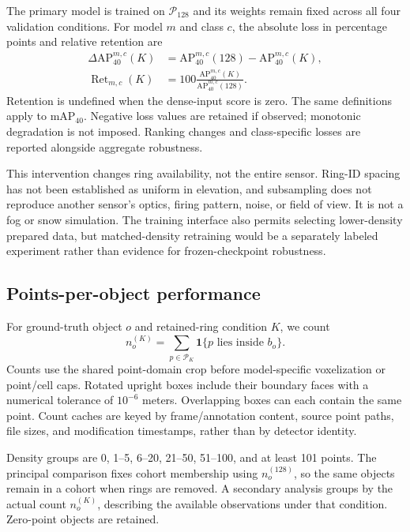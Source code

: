 \documentclass[10pt,twocolumn]{article}
\newcommand{\ap}{\mathrm{AP}_{40}}
\newcommand{\map}{\mathrm{mAP}_{40}}
\begin{document}
The primary model is trained on $\mathcal{P}_{128}$ and its weights remain fixed across all four validation conditions. For model $m$ and class $c$, the absolute loss in percentage points and relative retention are
\begin{align}
\Delta\ap^{m,c}(K)&=\ap^{m,c}(128)-\ap^{m,c}(K),\\
\operatorname{Ret}_{m,c}(K)&=100\frac{\ap^{m,c}(K)}{\ap^{m,c}(128)}.
\end{align}
Retention is undefined when the dense-input score is zero. The same definitions apply to $\map$. Negative loss values are retained if observed; monotonic degradation is not imposed. Ranking changes and class-specific losses are reported alongside aggregate robustness.

This intervention changes ring availability, not the entire sensor. Ring-ID spacing has not been established as uniform in elevation, and subsampling does not reproduce another sensor's optics, firing pattern, noise, or field of view. It is not a fog or snow simulation. The training interface also permits selecting lower-density prepared data, but matched-density retraining would be a separately labeled experiment rather than evidence for frozen-checkpoint robustness.

\subsection{Points-per-object performance}
\label{sec:density}
For ground-truth object $o$ and retained-ring condition $K$, we count
\begin{equation}
n_o^{(K)}=\sum_{p\in\mathcal{P}_K}\mathbf{1}\{p\text{ lies inside }b_o\}.
\end{equation}
Counts use the shared point-domain crop before model-specific voxelization or point/cell caps. Rotated upright boxes include their boundary faces with a numerical tolerance of $10^{-6}$ meters. Overlapping boxes can each contain the same point. Count caches are keyed by frame/annotation content, source point paths, file sizes, and modification timestamps, rather than by detector identity.

Density groups are 0, 1--5, 6--20, 21--50, 51--100, and at least 101 points. The principal comparison fixes cohort membership using $n_o^{(128)}$, so the same objects remain in a cohort when rings are removed. A secondary analysis groups by the actual count $n_o^{(K)}$, describing the available observations under that condition. Zero-point objects are retained.
\end{document}
